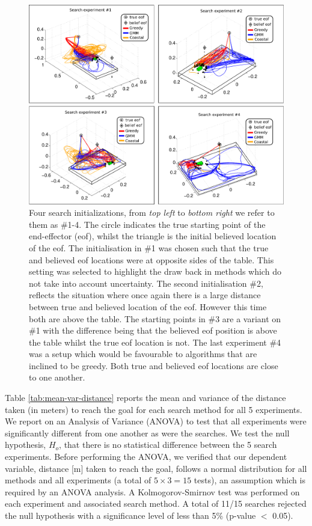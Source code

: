 \begin{figure}
   \centering
 \includegraphics[width=\textwidth]{./ch3-Search/Figures/Figure11}
\caption{Four search initializations, from \textit{top left} to \textit{bottom right} we refer to them as \#1-4. The 
circle indicates the true starting point of the end-effector (eof), whilst the triangle is the initial believed location of the eof.
The initialisation in \#1 was chosen such that the true and believed eof locations were at opposite sides of the table. 
This setting was selected to highlight the draw back in methods which do not take into account uncertainty. 
The second initialisation \#2, reflects the situation where once again there is a large distance between true and believed location of 
the eof. However this time both are above the table. The starting points in \#3 are a variant on \#1 
with the difference being that the believed eof position is above the table whilst the true eof location is not. The last 
experiment \#4 was a setup which would be favourable to algorithms that are inclined to be greedy. Both true and believed 
eof locations are close to one another.}
\label{fig:four-initialisations}
\end{figure}

Table \ref{tab:mean-var-distance} reports the mean and variance of the distance taken (in meters) to reach the goal for each search 
method for all 5 experiments.
We report on an Analysis of Variance (ANOVA) to test that all experiments were 
significantly different from one another as were the searches. We test the null hypothesis,  $H_o$,  that there is 
no statistical difference between the 5 search experiments. 
Before performing the ANOVA, we verified that our dependent variable, distance [m] taken to reach the goal, follows a normal 
distribution for all methods and all experiments (a total of $5 \times 3 = 15$ tests), an assumption which is required by 
an ANOVA analysis. A Kolmogorov-Smirnov test was performed on each experiment and associated search method. A total 
of 11/15 searches rejected the null hypothesis with a significance level of less than 5\% (p-value $<$ 0.05). 

